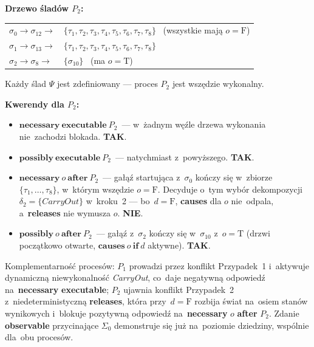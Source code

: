 \documentclass[11pt,a4paper]{article}
\newcommand{\causes}{\textbf{causes}}
\newcommand{\aft}{\textbf{after}}
\renewcommand{\iff}{\textbf{if}}
\newcommand{\releases}{\textbf{releases}}
\newcommand{\observable}{\textbf{observable}}
\newcommand{\necessary}{\textbf{necessary}}
\newcommand{\possibly}{\textbf{possibly}}
\newcommand{\executable}{\textbf{executable}}
\theoremstyle{definition}
\begin{document}
\medskip
\noindent\textbf{Drzewo śladów $P_2$:}
\begin{center}
\begin{tabular}{@{}l@{\ }l@{}}
$\sigma_0 \to \sigma_{12} \to$ & $\{\tau_1, \tau_2, \tau_3, \tau_4, \tau_5, \tau_6, \tau_7, \tau_8\}$
    \ (wszystkie mają $o = \text{F}$) \\
$\sigma_1 \to \sigma_{13} \to$ & $\{\tau_1, \tau_2, \tau_3, \tau_4, \tau_5, \tau_6, \tau_7, \tau_8\}$ \\
$\sigma_2 \to \sigma_{8} \to$  & $\{\sigma_{10}\}$
    \ (ma $o = \text{T}$) \\
\end{tabular}
\end{center}
Każdy ślad $\Psi$ jest zdefiniowany --- proces $P_2$ jest wszędzie wykonalny.

\medskip
\noindent\textbf{Kwerendy dla $P_2$:}
\begin{itemize}
  \item $\necessary\ \executable\ P_2$~---
    w~żadnym węźle drzewa wykonania nie~zachodzi blokada. \textbf{TAK}.

  \item $\possibly\ \executable\ P_2$~---
    natychmiast z~powyższego. \textbf{TAK}.

  \item $\necessary\ o\ \aft\ P_2$~---
    gałąź startująca z~$\sigma_0$ kończy się w~zbiorze $\{\tau_1, \ldots, \tau_8\}$,
    w~którym wszędzie $o = \text{F}$. Decyduje o~tym wybór dekompozycji
    $\delta_2 = \{\mathit{CarryOut}\}$ w~kroku~2 --- bo~$d = \text{F}$,
    \causes{} dla $o$ nie~odpala, a~\releases{} nie wymusza $o$. \textbf{NIE}.

  \item $\possibly\ o\ \aft\ P_2$~---
    gałąź z~$\sigma_2$ kończy się w~$\sigma_{10}$ z~$o = \text{T}$
    (drzwi początkowo otwarte, $\causes\ o\ \iff\ d$ aktywne). \textbf{TAK}.
\end{itemize}

\medskip
\noindent Komplementarność procesów: $P_1$ prowadzi przez konflikt Przypadek~1
i~aktywuje dynamiczną niewykonalność \textit{CarryOut}, co~daje negatywną
odpowiedź na~\necessary{} \executable{}; $P_2$ ujawnia konflikt Przypadek~2
z~niedeterministyczną \releases{}, która przy~$d = \text{F}$ rozbija świat
na~osiem stanów wynikowych i~blokuje pozytywną odpowiedź na~\necessary{} $o$
\aft{} $P_2$. Zdanie \observable{} przycinające $\Sigma_0$ demonstruje
się już na~poziomie dziedziny, wspólnie dla~obu procesów.
\end{document}
